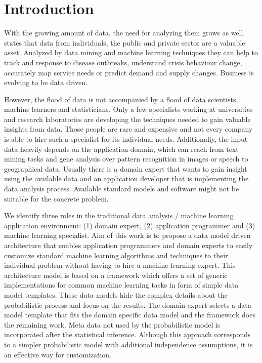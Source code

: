 \section{Introduction}

With the growing amount of data, the need for analyzing them grows as well. \textcite{forum2012bigdata} states that data from individuals, the public and private sector are a valuable asset. Analyzed by data mining and machine learning techniques they can help to track and response to disease outbreaks, understand crisis behaviour change, accurately map service needs or predict demand and supply changes. Business is evolving to be data driven.

However, the flood of data is not accompanied by a flood of data scientists, machine learners and statisticians. Only a few specialists working at universities and research laboratories are developing the techniques needed to gain valuable insights from data. Those people are rare and expensive and not every company is able to hire such a specialist for its individual needs. Additionally, the input data heavily depends on the application domain, which can reach from text mining tasks and gene analysis over pattern recognition in images or speech to geographical data. Usually there is a domain expert that wants to gain insight using the available data and an application developer that is implementing the data analysis process. Available standard models and software might not be suitable for the concrete problem.

We identify three roles in the traditional data analysis / machine learning application environment: (1) domain expert, (2) application programmer and (3) machine learning specialist. Aim of this work is to propose a data model driven architecture that enables application programmers and domain experts to easily customize standard machine learning algorithms and techniques to their individual problem without having to hire a machine learning expert. This architecture model is based on a framework which offers a set of generic implementations for common machine learning tasks in form of simple data model templates. These data models hide the complex details about the probabilistic process and focus on the results. The domain expert selects a data model template that fits the domain specific data model and the framework does the remaining work. Meta data not used by the probabilistic model is incorporated after the statistical inference. Although this approach corresponds to a simpler probabilistic model with additional independence assumptions, it is an effective way for customization.

